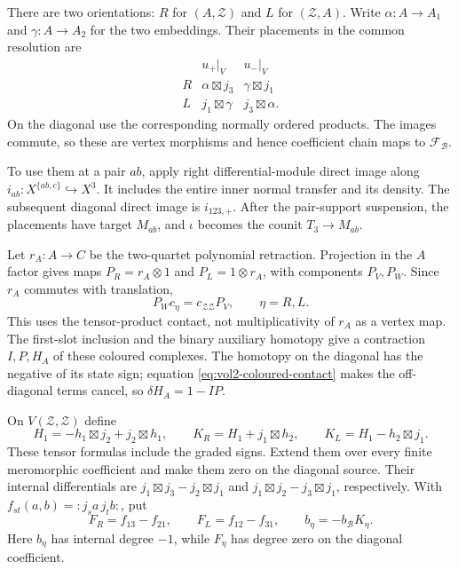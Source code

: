 There are two orientations: $R$ for $(A,\mathcal Z)$ and
$L$ for $(\mathcal Z,A)$. Write $\alpha:A\to A_1$ and
$\gamma:A\to A_2$ for the two embeddings. Their placements
in the common resolution are
\begin{equation}\label{eq:vol2-coloured-placements}
 \begin{array}{c|cc}
 &u_+|_V&u_-|_V\\\hline
 R&\alpha\boxtimes j_3&\gamma\boxtimes j_1\\
 L&j_1\boxtimes\gamma&j_3\boxtimes\alpha.
 \end{array}
\end{equation}
On the diagonal use the corresponding normally ordered
products. The images commute, so these are vertex morphisms
and hence coefficient chain maps to $\mathcal F_{\mathcal B}$.

To use them at a pair $ab$, apply right differential-module
direct image along $i_{ab}:X^{\{ab,c\}}\hookrightarrow X^3$.
It includes the entire inner normal transfer and its density.
The subsequent diagonal direct image is $i_{123,+}$.
After the pair-support suspension, the placements have target
$M_{ab}$, and $\iota$ becomes the counit $T_3\to M_{ab}$.

Let $r_A:A\to C$ be the two-quartet polynomial retraction.
Projection in the $A$ factor gives maps $P_R=r_A\otimes1$
and $P_L=1\otimes r_A$, with components $P_V,P_W$.
Since $r_A$ commutes with translation,
\begin{equation}\label{eq:vol2-coloured-projection}
 P_Wc_\eta=c_{\mathcal Z\mathcal Z}P_V,
 \qquad \eta=R,L.
\end{equation}
This uses the tensor-product contact, not multiplicativity
of $r_A$ as a vertex map. The first-slot inclusion and the
binary auxiliary homotopy give a contraction $I,P,H_A$ of
these coloured complexes. The homotopy on the diagonal has
the negative of its state sign; equation
\eqref{eq:vol2-coloured-contact} makes the off-diagonal terms
cancel, so $\delta H_A=1-IP$.

On $V(\mathcal Z,\mathcal Z)$ define
\[
 H_1=-h_1\boxtimes j_2+j_2\boxtimes h_1,
 \qquad K_R=H_1+j_1\boxtimes h_2,
 \qquad K_L=H_1-h_2\boxtimes j_1.
\]
These tensor formulas include the graded signs. Extend them
over every finite meromorphic coefficient and make them zero
on the diagonal source. Their internal differentials are
$j_1\boxtimes j_3-j_2\boxtimes j_1$ and
$j_1\boxtimes j_2-j_3\boxtimes j_1$, respectively.
With $f_{st}(a,b)={:}j_sa\,j_tb{:}$, put
\begin{equation}\label{eq:vol2-coloured-defect}
 F_R=f_{13}-f_{21},\qquad F_L=f_{12}-f_{31},\qquad
 b_\eta=-b_{\mathcal B}K_\eta.
\end{equation}
Here $b_\eta$ has internal degree $-1$, while $F_\eta$ has
degree zero on the diagonal coefficient.

